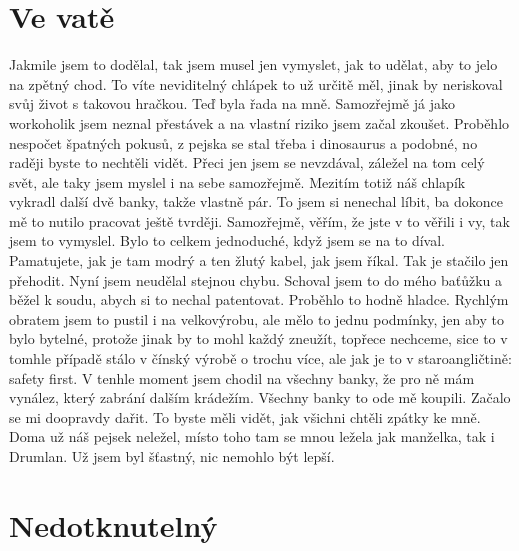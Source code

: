 \section{Ve vatě}

Jakmile jsem to dodělal, tak jsem musel jen vymyslet, jak to udělat, aby to jelo na zpětný chod. To víte neviditelný chlápek to už určitě měl, jinak by neriskoval svůj život s takovou hračkou. Teď byla řada na mně. Samozřejmě já jako workoholik jsem neznal přestávek a na vlastní riziko jsem začal zkoušet. Proběhlo nespočet špatných pokusů, z pejska se stal třeba i dinosaurus a podobné, no raději byste to nechtěli vidět. Přeci jen jsem se nevzdával, záležel na tom celý svět, ale taky jsem myslel i na sebe samozřejmě. Mezitím totiž náš chlapík vykradl další dvě banky, takže vlastně pár. To jsem si nenechal líbit, ba dokonce mě to nutilo pracovat ještě tvrději. Samozřejmě, věřím, že jste v to věřili i vy, tak jsem to vymyslel. Bylo to celkem jednoduché, když jsem se na to díval. Pamatujete, jak je tam modrý a ten žlutý kabel, jak jsem říkal. Tak je stačilo jen přehodit. Nyní jsem neudělal stejnou chybu. Schoval jsem to do mého baťůžku a běžel k soudu, abych si to nechal patentovat. Proběhlo to hodně hladce. Rychlým obratem jsem to pustil i na velkovýrobu, ale mělo to jednu podmínky, jen aby to bylo bytelné, protože jinak by to mohl každý zneužít, topřece nechceme, sice to v tomhle případě stálo v čínský výrobě o trochu více, ale jak je to v staroangličtině: safety first. V tenhle moment jsem chodil na všechny banky, že pro ně mám vynález, který zabrání dalším krádežím. Všechny banky to ode mě koupili. Začalo se mi doopravdy dařit. To byste měli vidět, jak všichni chtěli zpátky ke mně. Doma už náš pejsek neležel, místo toho tam se mnou ležela jak manželka, tak i Drumlan. Už jsem byl šťastný, nic nemohlo být lepší.

\section{Nedotknutelný}

